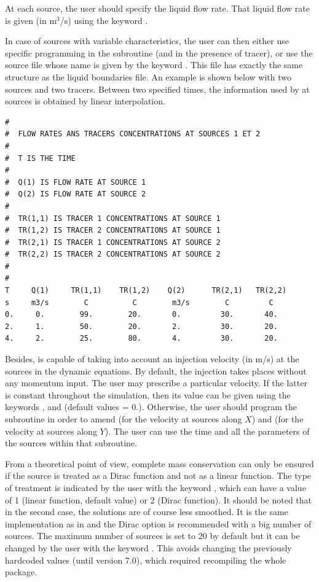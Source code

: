 At each source, the user should specify the liquid flow rate. That liquid flow
rate is given (in m${}^{3}$/s) using the keyword .

In case of sources with variable characteristics, the user can then either use
specific programming in the  subroutine (and
 in the presence of tracer), or use the source file
whose name is given by the keyword .
This file has exactly the same structure as the liquid
boundaries file. An example is shown below with two sources and two tracers.
Between two specified times, the information used by  at sources is
obtained by linear interpolation.

\begin{lstlisting}[language=TelemacCas]
#
#  FLOW RATES ANS TRACERS CONCENTRATIONS AT SOURCES 1 ET 2
#
#  T IS THE TIME
#
#  Q(1) IS FLOW RATE AT SOURCE 1
#  Q(2) IS FLOW RATE AT SOURCE 2
#
#  TR(1,1) IS TRACER 1 CONCENTRATIONS AT SOURCE 1
#  TR(1,2) IS TRACER 2 CONCENTRATIONS AT SOURCE 1
#  TR(2,1) IS TRACER 1 CONCENTRATIONS AT SOURCE 2
#  TR(2,2) IS TRACER 2 CONCENTRATIONS AT SOURCE 2
#
#
T     Q(1)     TR(1,1)    TR(1,2)    Q(2)      TR(2,1)   TR(2,2)
s     m3/s        C          C        m3/s        C         C
0.     0.        99.        20.       0.         30.       40.
2.     1.        50.        20.       2.         30.       20.
4.     2.        25.        80.       4.         30.       20.
\end{lstlisting}

Besides,  is capable of taking into account an injection velocity (in
m/s) at the sources in the dynamic equations. By default, the injection takes
places without any momentum input. The user may prescribe a particular
velocity. If the latter is constant throughout the simulation, then its value
can be given using the keywords ,
 and
 (default values = 0.).
Otherwise, the user should program the  subroutine
in order to amend  (for the
velocity at sources along $X$) and  (for the velocity at sources
along $Y$). The user can use the time and all the parameters of the sources
within that subroutine.

From a theoretical point of view, complete mass conservation can only be ensured
if the source is treated as a Dirac function and not as a linear function.
The type of treatment is indicated by the user with the keyword
, which can have a value of 1 (linear function,
default value) or 2 (Dirac function).
It should be noted that in the second case, the solutions are of course
less smoothed.
It is the same implementation as in  and the Dirac option is
recommended with a big number of sources.
The maximum number of sources is set to 20 by default but it can be changed
by the user with the keyword .
This avoids changing the previously hardcoded values (until version 7.0),
which required recompiling the whole package.

